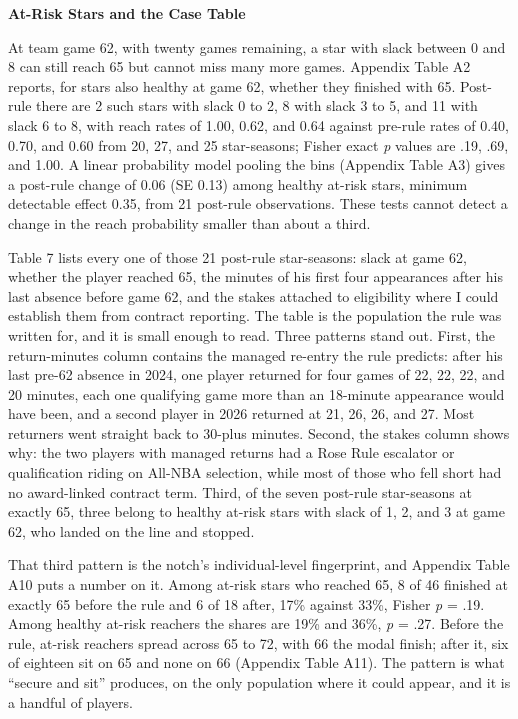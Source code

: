 \documentclass[12pt]{article}
\newcommand{\ltwo}[1]{\par\medskip\noindent\textbf{#1}\par\nopagebreak}
\begin{document}
\ltwo{At-Risk Stars and the Case Table}


At team game 62, with twenty games remaining, a star with slack between 0 and 8 can still reach 65 but cannot miss many more games. Appendix Table A2 reports, for stars also healthy at game 62, whether they finished with 65. Post-rule there are 2 such stars with slack 0 to 2, 8 with slack 3 to 5, and 11 with slack 6 to 8, with reach rates of 1.00, 0.62, and 0.64 against pre-rule rates of 0.40, 0.70, and 0.60 from 20, 27, and 25 star-seasons; Fisher exact \emph{p} values are .19, .69, and 1.00. A linear probability model pooling the bins (Appendix Table A3) gives a post-rule change of 0.06 (SE 0.13) among healthy at-risk stars, minimum detectable effect 0.35, from 21 post-rule observations. These tests cannot detect a change in the reach probability smaller than about a third.

Table 7 lists every one of those 21 post-rule star-seasons: slack at game 62, whether the player reached 65, the minutes of his first four appearances after his last absence before game 62, and the stakes attached to eligibility where I could establish them from contract reporting. The table is the population the rule was written for, and it is small enough to read. Three patterns stand out. First, the return-minutes column contains the managed re-entry the rule predicts: after his last pre-62 absence in 2024, one player returned for four games of 22, 22, 22, and 20 minutes, each one qualifying game more than an 18-minute appearance would have been, and a second player in 2026 returned at 21, 26, 26, and 27. Most returners went straight back to 30-plus minutes. Second, the stakes column shows why: the two players with managed returns had a Rose Rule escalator or qualification riding on All-NBA selection, while most of those who fell short had no award-linked contract term. Third, of the seven post-rule star-seasons at exactly 65, three belong to healthy at-risk stars with slack of 1, 2, and 3 at game 62, who landed on the line and stopped.

That third pattern is the notch's individual-level fingerprint, and Appendix Table A10 puts a number on it. Among at-risk stars who reached 65, 8 of 46 finished at exactly 65 before the rule and 6 of 18 after, 17\% against 33\%, Fisher \emph{p} = .19. Among healthy at-risk reachers the shares are 19\% and 36\%, \emph{p} = .27. Before the rule, at-risk reachers spread across 65 to 72, with 66 the modal finish; after it, six of eighteen sit on 65 and none on 66 (Appendix Table A11). The pattern is what ``secure and sit'' produces, on the only population where it could appear, and it is a handful of players.
\end{document}

